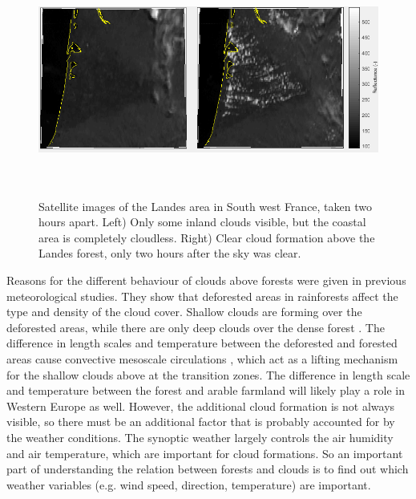 \documentclass{article}
\begin{document}
\begin{figure}[H]
	\centering
	\includegraphics[height=3in]{figures/cloudform1.png}
	\caption{Satellite images of the Landes area in South west France, taken two hours apart. Left) Only some inland clouds visible, but the coastal area is completely cloudless. Right) Clear cloud formation above the Landes forest, only two hours after the sky was clear. }
	\label{fig:cloudsoverforest}
\end{figure}

Reasons for the different behaviour of clouds above forests were given in previous meteorological studies. They show that deforested areas in rainforests affect the type and density of the cloud cover. Shallow clouds are forming over the deforested areas, while there are only deep clouds over the dense forest \parencite{chagnon04}. The difference in length scales \parencite{irvine97} and temperature between the deforested and forested areas cause convective mesoscale circulations \parencite{souza00}, which act as a lifting mechanism for the shallow clouds above at the transition zones. The difference in length scale and temperature between the forest and arable farmland will likely play a role in Western Europe as well. However, the additional cloud formation is not always visible, so there must be an additional factor that is probably accounted for by the weather conditions. The synoptic weather largely controls the air humidity and air temperature, which are important for cloud formations. So an important part of understanding the relation between forests and clouds is to find out which weather variables (e.g. wind speed, direction, temperature) are important.\\
\end{document}
